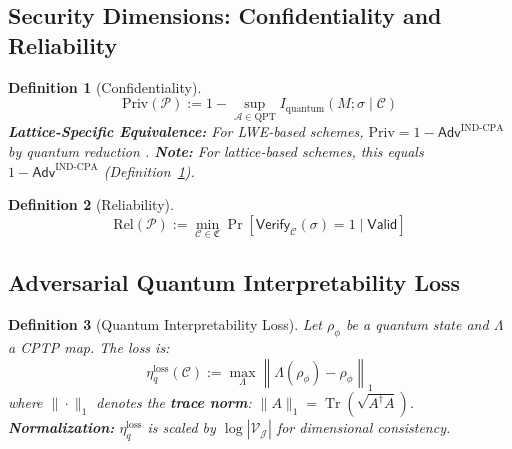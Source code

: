 \documentclass[preprint,12pt]{elsarticle}
\newtheorem{definition}{Definition}[section]
\newcommand{\Adv}{\mathsf{Adv}}
\begin{document}
        \subsection{Security Dimensions: Confidentiality and Reliability}\label{subsec:security_dimensions}

            \begin{definition}[Confidentiality]\label{def:confidentiality}
                \begin{equation}\label{eq:confidentiality}
                    \mathrm{Priv}(\mathcal{P}) := 1 - \sup_{\mathcal{A} \in \mathrm{QPT}} I_{\text{quantum}}(M; \sigma \mid \mathcal{C})
                \end{equation}
                \textbf{Lattice-Specific Equivalence:} For LWE-based schemes, $\mathrm{Priv} = 1 - \Adv^{\mathrm{IND}\mbox{-}\mathrm{CPA}}$ by quantum reduction \cite{Regev2009}.
                \textbf{Note:} For lattice-based schemes, this equals $1 - \Adv^{\mathrm{IND}\mbox{-}\mathrm{CPA}}$ (Definition~\ref{def:confidentiality}).
            \end{definition}

            \begin{definition}[Reliability]\label{def:reliability}
                \begin{equation}\label{eq:reliability}
                    \mathrm{Rel}(\mathcal{P}) := \min_{\mathcal{C} \in \mathfrak{C}} \Pr[\mathsf{Verify}_{\mathcal{C}}(\sigma) = 1 \mid \mathsf{Valid}]
                \end{equation}
            \end{definition}


        \subsection{Adversarial Quantum Interpretability Loss}
            \label{subsec:quantum_loss}

            \begin{definition}[Quantum Interpretability Loss]\label{def:quantum_loss}
                Let $\rho_\phi$ be a quantum state and $\Lambda$ a CPTP map. The loss is:
                \begin{equation}\label{eq:quantum_loss}
                    \eta_q^{\mathrm{loss}}(\mathcal{C}) := \max_{\Lambda} \left\| \Lambda(\rho_\phi) - \rho_\phi \right\|_1
                \end{equation}
                where $\|\cdot\|_1$ denotes the \textbf{trace norm}: $\|A\|_1 = \operatorname{Tr}(\sqrt{A^\dagger A})$.
                \textbf{Normalization:} $\eta_q^{\text{loss}}$ is scaled by $\log|\mathcal{V_J}|$ for dimensional consistency.
            \end{definition}
\end{document}
